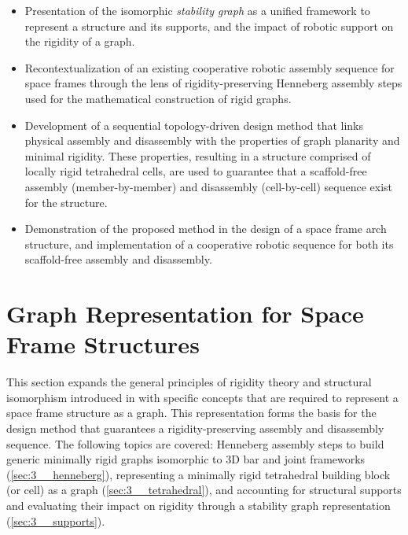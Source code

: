     \begin{itemize}
        \item Presentation of the isomorphic \textit{stability graph} as a unified framework to represent a structure and its supports, and the impact of robotic support on the rigidity of a graph.
        \item Recontextualization of an existing cooperative robotic assembly sequence for space frames \citep{parascho_cooperative_2019} through the lens of rigidity-preserving Henneberg assembly steps used for the mathematical construction of rigid graphs.  
        \item Development of a sequential topology-driven design method that links physical assembly and disassembly with the properties of graph planarity and minimal rigidity. These properties, resulting in a structure comprised of locally rigid tetrahedral cells, are used to guarantee that a scaffold-free assembly (member-by-member) and disassembly (cell-by-cell) sequence exist for the structure. 
        \item Demonstration of the proposed method in the design of a space frame arch structure, and implementation of a cooperative robotic sequence for both its scaffold-free assembly and disassembly.
    \end{itemize}
     


\section{Graph Representation for Space Frame Structures}\label{sec:3_spaceframes}
    This section expands the general principles of rigidity theory and structural isomorphism introduced in  with specific concepts that are required to represent a space frame structure as a graph. This representation forms the basis for the design method that guarantees a rigidity-preserving assembly and disassembly sequence. The following topics are covered: Henneberg assembly steps to build generic minimally rigid graphs isomorphic to 3D bar and joint frameworks  (\cref{sec:3__henneberg}), representing a minimally rigid tetrahedral building block (or cell) as a graph (\cref{sec:3__tetrahedral}), and accounting for structural supports and evaluating their impact on rigidity through a stability graph representation (\cref{sec:3__supports}).
    
